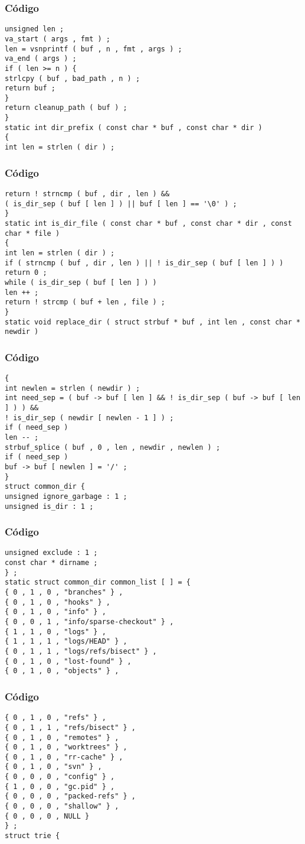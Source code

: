\documentclass{beamer}
\begin{document}
\begin{frame}[fragile]
\frametitle{C\'odigo}
\begin{verbatim}
unsigned len ; 
va_start ( args , fmt ) ; 
len = vsnprintf ( buf , n , fmt , args ) ; 
va_end ( args ) ; 
if ( len >= n ) { 
strlcpy ( buf , bad_path , n ) ; 
return buf ; 
} 
return cleanup_path ( buf ) ; 
} 
static int dir_prefix ( const char * buf , const char * dir ) 
{ 
int len = strlen ( dir ) ; 
\end{verbatim}
\end{frame}
\begin{frame}[fragile]
\frametitle{C\'odigo}
\begin{verbatim}
return ! strncmp ( buf , dir , len ) && 
( is_dir_sep ( buf [ len ] ) || buf [ len ] == '\0' ) ; 
} 
static int is_dir_file ( const char * buf , const char * dir , const char * file ) 
{ 
int len = strlen ( dir ) ; 
if ( strncmp ( buf , dir , len ) || ! is_dir_sep ( buf [ len ] ) ) 
return 0 ; 
while ( is_dir_sep ( buf [ len ] ) ) 
len ++ ; 
return ! strcmp ( buf + len , file ) ; 
} 
static void replace_dir ( struct strbuf * buf , int len , const char * newdir ) 
\end{verbatim}
\end{frame}
\begin{frame}[fragile]
\frametitle{C\'odigo}
\begin{verbatim}
{ 
int newlen = strlen ( newdir ) ; 
int need_sep = ( buf -> buf [ len ] && ! is_dir_sep ( buf -> buf [ len ] ) ) && 
! is_dir_sep ( newdir [ newlen - 1 ] ) ; 
if ( need_sep ) 
len -- ; 
strbuf_splice ( buf , 0 , len , newdir , newlen ) ; 
if ( need_sep ) 
buf -> buf [ newlen ] = '/' ; 
} 
struct common_dir { 
unsigned ignore_garbage : 1 ; 
unsigned is_dir : 1 ; 
\end{verbatim}
\end{frame}
\begin{frame}[fragile]
\frametitle{C\'odigo}
\begin{verbatim}
unsigned exclude : 1 ; 
const char * dirname ; 
} ; 
static struct common_dir common_list [ ] = { 
{ 0 , 1 , 0 , "branches" } , 
{ 0 , 1 , 0 , "hooks" } , 
{ 0 , 1 , 0 , "info" } , 
{ 0 , 0 , 1 , "info/sparse-checkout" } , 
{ 1 , 1 , 0 , "logs" } , 
{ 1 , 1 , 1 , "logs/HEAD" } , 
{ 0 , 1 , 1 , "logs/refs/bisect" } , 
{ 0 , 1 , 0 , "lost-found" } , 
{ 0 , 1 , 0 , "objects" } , 
\end{verbatim}
\end{frame}
\begin{frame}[fragile]
\frametitle{C\'odigo}
\begin{verbatim}
{ 0 , 1 , 0 , "refs" } , 
{ 0 , 1 , 1 , "refs/bisect" } , 
{ 0 , 1 , 0 , "remotes" } , 
{ 0 , 1 , 0 , "worktrees" } , 
{ 0 , 1 , 0 , "rr-cache" } , 
{ 0 , 1 , 0 , "svn" } , 
{ 0 , 0 , 0 , "config" } , 
{ 1 , 0 , 0 , "gc.pid" } , 
{ 0 , 0 , 0 , "packed-refs" } , 
{ 0 , 0 , 0 , "shallow" } , 
{ 0 , 0 , 0 , NULL } 
} ; 
struct trie { 
\end{verbatim}
\end{frame}
\end{document}
